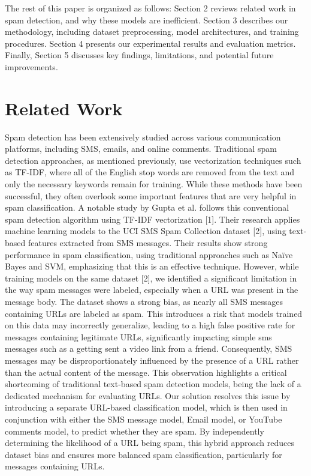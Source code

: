 \documentclass{article}
\begin{document}
\newline
\newline
The rest of this paper is organized as follows: Section 2 reviews related work in spam detection, and why these models are inefficient. Section 3 describes our methodology, including dataset preprocessing, model architectures, and training procedures. Section 4 presents our experimental results and evaluation metrics. Finally, Section 5 discusses key findings, limitations, and potential future improvements.


\section{Related Work}
Spam detection has been extensively studied across various communication platforms, including SMS, emails, and online comments. Traditional spam detection approaches, as mentioned previously, use vectorization techniques such as TF-IDF, where all of the English stop words are removed from the text and only the necessary keywords remain for training. While these methods have been successful, they often overlook some important features that are very helpful in spam classification.
\newline
\newline
A notable study by Gupta et al. follows this conventional spam detection algorithm using TF-IDF vectorization [1]. Their research applies machine learning models to the UCI SMS Spam Collection dataset [2], using text-based features extracted from SMS messages. Their results show strong performance in spam classification, using traditional approaches such as Naïve Bayes and SVM, emphasizing that this is an effective technique.
\newline
\newline
However, while training models on the same dataset [2], we identified a significant limitation in the way spam messages were labeled, especially when a URL was present in the message body. The dataset shows a strong bias, as nearly all SMS messages containing URLs are labeled as spam. This introduces a risk that models trained on this data may incorrectly generalize, leading to a high false positive rate for messages containing legitimate URLs, significantly impacting simple sms messages such as a getting sent a video link from a friend. Consequently, SMS messages may be disproportionately influenced by the presence of a URL rather than the actual content of the message.
\newline
\newline
This observation highlights a critical shortcoming of traditional text-based spam detection models, being the lack of a dedicated mechanism for evaluating URLs. Our solution resolves this issue by introducing a separate URL-based classification model, which is then used in conjunction with either the SMS message model, Email model, or YouTube comments model, to predict whether they are spam. By independently determining the likelihood of a URL being spam, this hybrid approach reduces dataset bias and ensures more balanced spam classification, particularly for messages containing URLs.	
\end{document}
